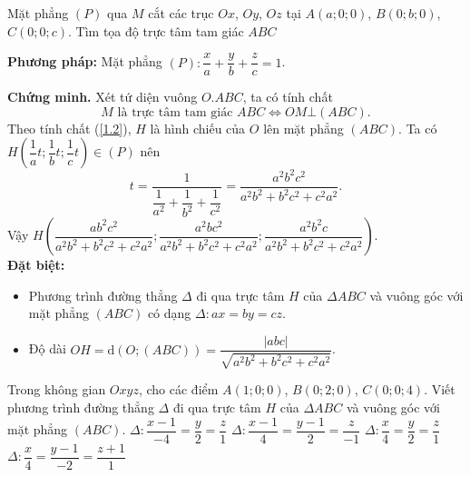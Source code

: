 \begin{dang}{}
	{Mặt phẳng $ (P) $ qua $ M $ cắt các trục $ Ox $, $ Oy $, $ Oz $ tại $ A(a;0;0) $, $ B(0;b;0) $, $ C(0;0;c) $. Tìm tọa độ trực tâm tam giác $ ABC $}
	
	\textbf{Phương pháp:} Mặt phẳng $ (P)\colon \dfrac{x}{a}+\dfrac{y}{b}+\dfrac{z}{c}=1$.
	
	\textbf{Chứng minh.} Xét tứ diện vuông $ O.ABC $, ta có tính chất
	\begin{equation}\label{1.2}
	M \text{ là trực tâm tam giác }ABC \Leftrightarrow OM\bot(ABC).	
	\end{equation}
	Theo tính chất (\ref{1.2}), $ H $ là hình chiếu của $ O $ lên mặt phẳng $ (ABC) $. Ta có $ H\left(\dfrac{1}{a}t;\dfrac{1}{b}t;\dfrac{1}{c}t\right) \in (P)$ nên
	\[t=\dfrac{1}{\dfrac{1}{a^2}+\dfrac{1}{b^2}+\dfrac{1}{c^2}}=\dfrac{a^2b^2c^2}{a^2b^2+b^2c^2+c^2a^2}.\]
	Vậy $ H\left(\dfrac{ab^2c^2}{a^2b^2+b^2c^2+c^2a^2};\dfrac{a^2bc^2}{a^2b^2+b^2c^2+c^2a^2};\dfrac{a^2b^2c}{a^2b^2+b^2c^2+c^2a^2}\right) $.\\
	\textbf{Đặt  biệt:} 
	\begin{itemize}
		\item Phương trình đường thẳng $\Delta$ đi qua trực tâm $H$ của $\Delta ABC$ và vuông góc với mặt phẳng $(ABC)$ có dạng $ \Delta\colon ax=by=cz $.
		\item Độ dài  $ OH =\mathrm{d}(O;(ABC))= \dfrac{|abc|}{\sqrt{a^2b^2+b^2c^2+c^2a^2}} $.
	\end{itemize}
	
\end{dang}

\begin{vd}%
	Trong không gian $Oxyz$, cho các điểm $A(1; 0; 0)$, $B(0; 2; 0)$, $C(0; 0; 4)$. Viết phương trình đường thẳng $\Delta$ đi qua trực tâm $H$ của $\Delta ABC$ và vuông góc với mặt phẳng $(ABC)$.
	\choice
	{ $\Delta: \dfrac{x-1}{-4}=\dfrac{y}{2}=\dfrac{z}{1}$}
	{ $\Delta: \dfrac{x-1}{4}=\dfrac{y-1}{2}=\dfrac{z}{-1}$}
	{\True $\Delta: \dfrac{x}{4}=\dfrac{y}{2}=\dfrac{z}{1}$}
	{ $\Delta: \dfrac{x}{4}=\dfrac{y-1}{-2}=\dfrac{z+1}{1}$}
\end{vd}

